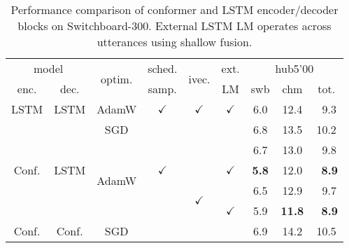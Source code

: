 \documentclass[a4paper]{article}
\begin{document}
\begin{table}
  \eightpt
  \centering
  \caption{Performance comparison of conformer and LSTM encoder/decoder blocks on Switchboard-300. External LSTM LM operates across utterances using shallow fusion.}
  \vspace{-3.5mm}
  \begin{tabular}{|@{}c@{}|@{}c@{}|@{}c@{}|@{}c@{}|@{}c@{}|@{}c@{}|c|c|@{}c@{}|}
    \hline
 \multicolumn{2}{|c|}{model} & \multirow{2}{*}{optim.} &  sched. & \multirow{2}{*}{ivec.} &  ext.        & \multicolumn{3}{c|}{hub5'00}  \\ \cline{1-2}\cline{7-9}
 enc.    &    dec.   &           &  samp.  &              &  LM          &     swb    &    chm     & \hspace{2mm}tot.\hspace{.5mm} \\
\hline
\hline
\multirow{1}{*}{LSTM}& \multirow{1}{*}{LSTM} &   
         AdamW   & $\checkmark$ & $\checkmark$ & $\checkmark$ &   6.0      & 12.4       & \textcolor{white}{0}9.3 \\
\hline
\hline
\multirow{5}{*}{Conf.}   & \multirow{5}{*}{LSTM}   & \multirow{1}{*}{SGD} & \multirow{5}{*}{$\checkmark$} & \hspace{7mm} & \hspace{6mm} &   6.8      & 13.5       & 10.2 \\ \cline{3-3}\cline{7-9}
         &           & \multirow{4}{*}{AdamW} &              &              &              &   6.7      & 13.0       & \textcolor{white}{0}9.8  \\ \cline{6-9}
\hspace{10mm} & \hspace{10mm} & \hspace{12mm} & \hspace{9mm} &              & $\checkmark$ &  \bf 5.8      & 12.0       & \bf \textcolor{white}{0}8.9  \\ \cline{5-5}\cline{6-9}
         &           &           &              & \multirow{2}{*}{$\checkmark$} &              &   6.5      & 12.9       & \textcolor{white}{0}9.7  \\ \cline{6-9}
         &           &           &              &              & $\checkmark$ & 5.9      & \bf 11.8       & \bf \textcolor{white}{0}8.9  \\
\hline
\hline
\multirow{6}{*}{Conf.} & \multirow{6}{*}{Conf.} &   SGD     &              &              &              &   6.9      &  14.2      & 10.5 \\ \cline{3-3}\cline{7-9}

\end{tabular}
\end{table}
\end{document}

